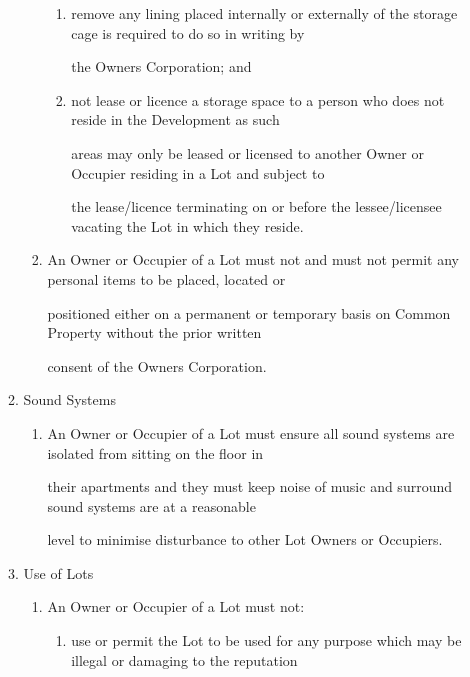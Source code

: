 \documentclass{article}
\begin{document}
\begin{enumerate}[label=\arabic*.]
\begin{enumerate}[label=\arabic{enumi}.\arabic*.]
\begin{enumerate}[label=(\arabic*)]
\begin{enumerate}[label=(\alph*)]
\item {\fontsize{9.962}{1} remove any lining placed internally or externally of the storage cage is required to do so in writing by }

{\fontsize{10.02}{1}the Owners Corporation; and }

\item {\fontsize{9.962}{1} not lease or licence a storage space to a person who does not reside in the Development as such }

{\fontsize{10.02}{1}areas may only be leased or licensed to another Owner or Occupier residing in a Lot and subject to }

\newpage

{\fontsize{10.02}{1}the lease/licence terminating on or before the lessee/licensee vacating the Lot in which they reside. }

\end{enumerate}
\item {\fontsize{9.962}{1} An Owner or Occupier of a Lot must not and must not permit any personal items to be placed, located or }

{\fontsize{10.02}{1}positioned either on a permanent or temporary basis on Common Property without the prior written }

{\fontsize{10.02}{1}consent of the Owners Corporation. }

\end{enumerate}
\item {\fontsize{9.99}{1} Sound Systems }

\begin{enumerate}[label=(\arabic*)]
\item {\fontsize{9.962}{1} An Owner or Occupier of a Lot must ensure all sound systems are isolated from sitting on the floor in }

{\fontsize{10.02}{1}their apartments and they must keep noise of music and surround sound systems are at a reasonable }

{\fontsize{10.02}{1}level to minimise disturbance to other Lot Owners or Occupiers. }

\end{enumerate}
\item {\fontsize{9.99}{1} Use of Lots }

\begin{enumerate}[label=(\arabic*)]
\item {\fontsize{9.962}{1} An Owner or Occupier of a Lot must not: }

\begin{enumerate}[label=(\alph*)]
\item {\fontsize{9.962}{1} use or permit the Lot to be used for any purpose which may be illegal or damaging to the reputation }


\end{enumerate}
\end{enumerate}
\end{enumerate}
\end{enumerate}
\end{document}

